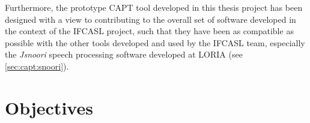 Furthermore, the prototype CAPT tool developed in this thesis project has been designed with a view to contributing to the overall set of software developed in the context of the IFCASL project, such that they have been as compatible as possible with the other tools developed and used by the IFCASL team, especially the \textit{Jsnoori} speech processing software developed at LORIA (see \cref{sec:capt:snoori}).


\section{Objectives}
\label{sec:intro:objectives}


